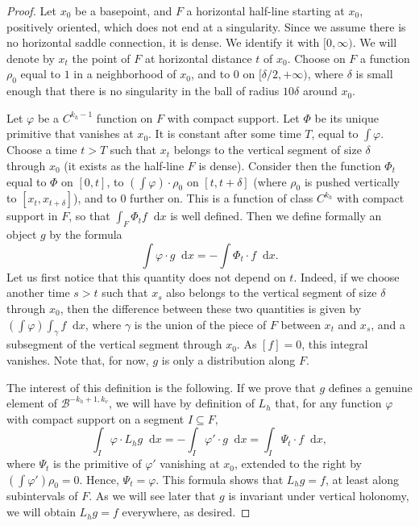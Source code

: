 \documentclass[11pt, a4paper, oneside, final, pagebackref]{amsart}
\newcommand{\boB}{\mathcal{B}}
\newcommand{\dd}{\mathop{}\!\mathrm{d}}
\renewcommand{\phi}{\varphi}
\theoremstyle{definition}
\numberwithin{equation}{section}
\begin{document}
\begin{proof}
Let $x_0$ be a basepoint, and $F$ a horizontal half-line starting at $x_0$,
positively oriented, which does not end at a singularity. Since we assume
there is no horizontal saddle connection, it is dense. We identify it with
$[0,\infty)$. We will denote by $x_t$ the point of $F$ at horizontal distance
$t$ of $x_0$. Choose on $F$ a function $\rho_0$ equal to $1$ in a
neighborhood of $x_0$, and to $0$ on $[\delta/2, +\infty)$, where $\delta$ is
small enough that there is no singularity in the ball of radius $10\delta$
around $x_0$.

Let $\phi$ be a $C^{k_h-1}$ function on $F$ with compact support. Let $\Phi$
be its unique primitive that vanishes at $x_0$. It is constant after some
time $T$, equal to $\int \phi$. Choose a time $t>T$ such that $x_t$ belongs
to the vertical segment of size $\delta$ through $x_0$ (it exists as the
half-line $F$ is dense). Consider then the function $\Phi_t$ equal to $\Phi$
on $[0, t]$, to $(\int \phi) \cdot \rho_0$ on $[t, t+\delta]$ (where $\rho_0$
is pushed vertically to $[x_t, x_{t+\delta}]$), and to $0$ further on. This
is a function of class $C^{k_h}$ with compact support in $F$, so that $\int_F
\Phi_t f \dd x$ is well defined. Then we define formally an object $g$ by the
formula
\begin{equation}
\label{eq:ipwuxcviopuw}
  \int \phi\cdot g \dd x = -\int \Phi_t \cdot f \dd x.
\end{equation}
Let us first notice that this quantity does not depend on $t$. Indeed, if we
choose another time $s>t$ such that $x_s$ also belongs to the vertical
segment of size $\delta$ through $x_0$, then the difference between these two
quantities is given by $(\int \phi) \int_\gamma f \dd x$, where $\gamma$ is
the union of the piece of $F$ between $x_t$ and $x_s$, and a subsegment of
the vertical segment through $x_0$. As $[f] = 0$, this integral vanishes.
Note that, for now, $g$ is only a distribution along $F$.

The interest of this definition is the following. If we prove that $g$
defines a genuine element of $\boB^{-k_h+1, k_v}$, we will have by definition
of $L_h$ that, for any function $\phi$ with compact support on a segment $I
\subseteq F$,
\begin{equation*}
  \int_I \phi \cdot L_h g \dd x = -\int_I \phi' \cdot g \dd x
  =\int_I \Psi_t \cdot f \dd x,
\end{equation*}
where $\Psi_t$ is the primitive of $\phi'$ vanishing at $x_0$, extended to
the right by $(\int\phi') \rho_0 = 0$. Hence, $\Psi_t = \phi$. This formula
shows that $L_h g = f$, at least along subintervals of $F$. As we will see
later that $g$ is invariant under vertical holonomy, we will obtain $L_h g =
f$ everywhere, as desired.


\end{proof}
\end{document}
